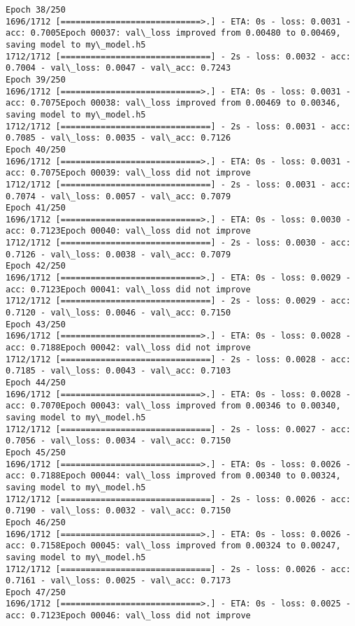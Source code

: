 \documentclass[11pt]{article}
\begin{document}
\begin{Verbatim}[commandchars=\\\{\}]
Epoch 38/250
1696/1712 [============================>.] - ETA: 0s - loss: 0.0031 - acc: 0.7005Epoch 00037: val\_loss improved from 0.00480 to 0.00469, saving model to my\_model.h5
1712/1712 [==============================] - 2s - loss: 0.0032 - acc: 0.7004 - val\_loss: 0.0047 - val\_acc: 0.7243
Epoch 39/250
1696/1712 [============================>.] - ETA: 0s - loss: 0.0031 - acc: 0.7075Epoch 00038: val\_loss improved from 0.00469 to 0.00346, saving model to my\_model.h5
1712/1712 [==============================] - 2s - loss: 0.0031 - acc: 0.7085 - val\_loss: 0.0035 - val\_acc: 0.7126
Epoch 40/250
1696/1712 [============================>.] - ETA: 0s - loss: 0.0031 - acc: 0.7075Epoch 00039: val\_loss did not improve
1712/1712 [==============================] - 2s - loss: 0.0031 - acc: 0.7074 - val\_loss: 0.0057 - val\_acc: 0.7079
Epoch 41/250
1696/1712 [============================>.] - ETA: 0s - loss: 0.0030 - acc: 0.7123Epoch 00040: val\_loss did not improve
1712/1712 [==============================] - 2s - loss: 0.0030 - acc: 0.7126 - val\_loss: 0.0038 - val\_acc: 0.7079
Epoch 42/250
1696/1712 [============================>.] - ETA: 0s - loss: 0.0029 - acc: 0.7123Epoch 00041: val\_loss did not improve
1712/1712 [==============================] - 2s - loss: 0.0029 - acc: 0.7120 - val\_loss: 0.0046 - val\_acc: 0.7150
Epoch 43/250
1696/1712 [============================>.] - ETA: 0s - loss: 0.0028 - acc: 0.7188Epoch 00042: val\_loss did not improve
1712/1712 [==============================] - 2s - loss: 0.0028 - acc: 0.7185 - val\_loss: 0.0043 - val\_acc: 0.7103
Epoch 44/250
1696/1712 [============================>.] - ETA: 0s - loss: 0.0028 - acc: 0.7070Epoch 00043: val\_loss improved from 0.00346 to 0.00340, saving model to my\_model.h5
1712/1712 [==============================] - 2s - loss: 0.0027 - acc: 0.7056 - val\_loss: 0.0034 - val\_acc: 0.7150
Epoch 45/250
1696/1712 [============================>.] - ETA: 0s - loss: 0.0026 - acc: 0.7188Epoch 00044: val\_loss improved from 0.00340 to 0.00324, saving model to my\_model.h5
1712/1712 [==============================] - 2s - loss: 0.0026 - acc: 0.7190 - val\_loss: 0.0032 - val\_acc: 0.7150
Epoch 46/250
1696/1712 [============================>.] - ETA: 0s - loss: 0.0026 - acc: 0.7158Epoch 00045: val\_loss improved from 0.00324 to 0.00247, saving model to my\_model.h5
1712/1712 [==============================] - 2s - loss: 0.0026 - acc: 0.7161 - val\_loss: 0.0025 - val\_acc: 0.7173
Epoch 47/250
1696/1712 [============================>.] - ETA: 0s - loss: 0.0025 - acc: 0.7123Epoch 00046: val\_loss did not improve

\end{Verbatim}
\end{document}
